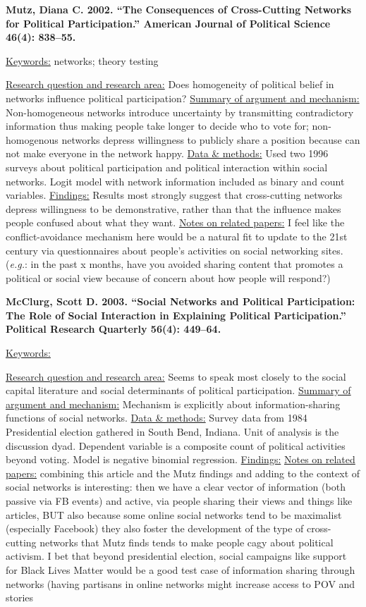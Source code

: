 \documentclass{article}[12pt]
\begin{document}
\textbf{Mutz, Diana C. 2002. “The Consequences of Cross-Cutting Networks for Political Participation.” American Journal of Political Science 46(4): 838–55.}

\underline{Keywords:} networks; theory testing

\underline{Research question and research area:} Does homogeneity of political belief in networks influence political participation?
\underline{Summary of argument and mechanism:} Non-homogeneous networks introduce uncertainty by transmitting contradictory information thus making people take longer to decide who to vote for; non-homogenous networks depress willingness to publicly share a position because can not make everyone in the network happy.
\underline{Data \& methods:} Used two 1996 surveys about political participation and political interaction within social networks. Logit model with network information included as binary and count variables.
\underline{Findings:} Results most strongly suggest that cross-cutting networks depress willingness to be demonstrative, rather than that the influence makes people confused about what they want.
\underline{Notes on related papers:} I feel like the conflict-avoidance mechanism here would be a natural fit to update to the 21st century via questionnaires about people's activities on social networking sites. (\textit{e.g.}: in the past x months, have you avoided sharing content that promotes a political or social view because of concern about how people will respond?)

\textbf{McClurg, Scott D. 2003. “Social Networks and Political Participation: The Role of Social Interaction in Explaining Political Participation.” Political Research Quarterly 56(4): 449–64.}

\underline{Keywords:}

\underline{Research question and research area:} Seems to speak most closely to the social capital literature and social determinants of political participation. 
\underline{Summary of argument and mechanism:} Mechanism is explicitly about information-sharing functions of social networks.
\underline{Data \& methods:} Survey data from 1984 Presidential election gathered in South Bend, Indiana. Unit of analysis is the discussion dyad. Dependent variable is a composite count of political activities beyond voting. Model is negative binomial regression.
\underline{Findings:} 
\underline{Notes on related papers:}
combining this article and the  Mutz findings and adding to the context  of social networks is interesting:
then we have a  clear vector of information (both  passive via FB  events) and active,  via people sharing  their views and  things like articles,  BUT also because some online social networks tend to be maximalist (especially Facebook) they also foster the  development of the type of cross- cutting networks that Mutz finds tends to make people cagy about political activism. I bet that beyond presidential election, social campaigns like support for Black Lives Matter would be a good test case of information sharing through networks (having partisans in online networks might increase access to POV and stories 
\end{document}
